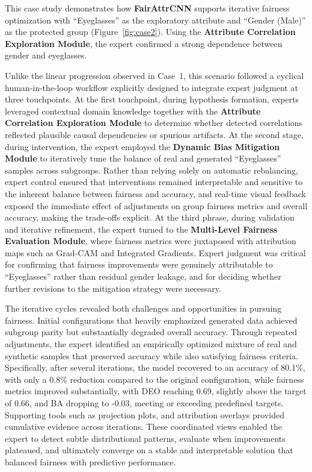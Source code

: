 \documentclass[sigconf]{acmart}
\newcommand{\REVISE}[1]{#1}
\begin{document}
\REVISE{This case study demonstrates how \textbf{FairAttrCNN} supports iterative fairness optimization with ``Eyeglasses'' as the exploratory attribute and ``Gender (Male)'' as the protected group (Figure~\ref{fig:case2}). Using the \textbf{Attribute Correlation Exploration Module}, the expert confirmed a strong dependence between gender and eyeglasses. }

\REVISE{Unlike the linear progression observed in Case~1, this scenario followed a cyclical human-in-the-loop workflow explicitly designed to integrate expert judgment at three touchpoints. At the first touchpoint, during hypothesis formation, experts leveraged contextual domain knowledge together with the \textbf{Attribute Correlation Exploration Module} to determine whether detected correlations reflected plausible causal dependencies or spurious artifacts. At the second stage, during intervention, the expert employed the \textbf{Dynamic Bias Mitigation Module} to iteratively tune the balance of real and generated ``Eyeglasses'' samples across subgroups. Rather than relying solely on automatic rebalancing, expert control ensured that interventions remained interpretable and sensitive to the inherent balance between fairness and accuracy, and real-time visual feedback exposed the immediate effect of adjustments on group fairness metrics and overall accuracy, making the trade-offs explicit. At the third phrase, during validation and iterative refinement, the expert turned to the \textbf{Multi-Level Fairness Evaluation Module}, where fairness metrics were juxtaposed with attribution maps such as Grad-CAM and Integrated Gradients. Expert judgment was critical for confirming that fairness improvements were genuinely attributable to ``Eyeglasses'' rather than residual gender leakage, and for deciding whether further revisions to the mitigation strategy were necessary.}

\REVISE{The iterative cycles revealed both challenges and opportunities in pursuing fairness. Initial configurations that heavily emphasized generated data achieved subgroup parity but substantially degraded overall accuracy. Through repeated adjustments, the expert identified an empirically optimized mixture of real and synthetic samples that preserved accuracy while also satisfying fairness criteria. Specifically, after several iterations, the model recovered to an accuracy of 80.1\%, with only a 0.8\% reduction compared to the original configuration, while fairness metrics improved substantially, with DEO reaching 0.69, slightly above the target of 0.66, and BA dropping to -0.03, meeting or exceeding predefined targets. Supporting tools such as projection plots, and attribution overlays provided cumulative evidence across iterations. These coordinated views enabled the expert to detect subtle distributional patterns, evaluate when improvements plateaued, and ultimately converge on a stable and interpretable solution that balanced fairness with predictive performance.}
\end{document}

